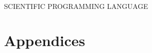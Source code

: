 \documentclass[10pt,a4paper]{article}
\begin{document}
SCIENTIFIC PROGRAMMING LANGUAGE
\appendix
{}
\section*{Appendices}

\newpage

\end{document}
